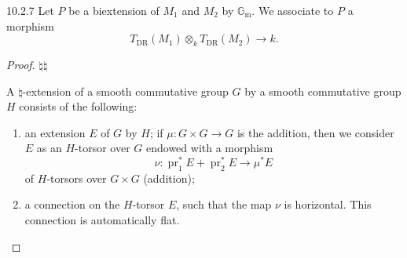 \begin{construction}{10.2.7}
    Let \(P\) be a biextension of \(M_1\) and \(M_2\) by \(\mathbb {G}_\mathrm {m}\).
    We associate to \(P\) a morphism
    \[       T_\mathrm {DR}(M_1)\otimes _k T_\mathrm {DR}(M_2)       \to  k.     \]\begin{proof}\(\natural \)\(\natural \)\label{hodge-theory-iii-10.2.7.1}\par{}A \(\natural \)-extension of a smooth commutative group \(G\) by a smooth commutative group \(H\) consists of the following:

        
 \begin{enumerate}
          
 \item[(a)]
            an extension \(E\) of \(G\) by \(H\);
            if \(\mu \colon  G\times  G\to  G\) is the addition, then we consider \(E\) as an \(H\)-torsor over \(G\) endowed with a morphism
            \[               \nu \colon  \operatorname {pr}_1^*E + \operatorname {pr}_2^*E               \to  \mu ^*E             \]
            of \(H\)-torsors over \(G\times  G\) (addition);
          

          
 \item[(b)]
            a connection on the \(H\)-torsor \(E\), such that the map \(\nu \) is horizontal.
            This connection is automatically flat.
          


\end{enumerate}
\end{proof}
\end{construction}
